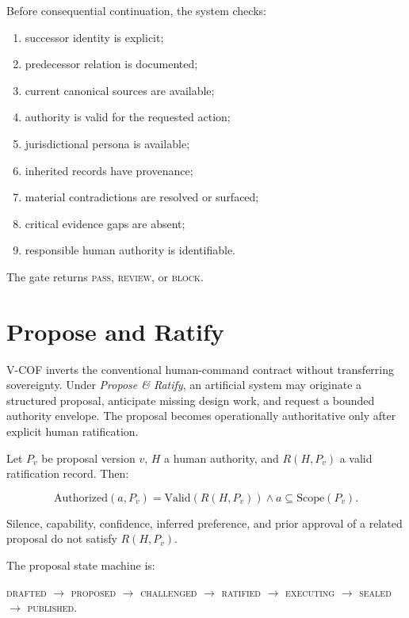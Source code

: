 \documentclass[10pt]{article}
\begin{document}
Before consequential continuation, the system checks:

\begin{enumerate}[leftmargin=*]
  \item successor identity is explicit;
  \item predecessor relation is documented;
  \item current canonical sources are available;
  \item authority is valid for the requested action;
  \item jurisdictional persona is available;
  \item inherited records have provenance;
  \item material contradictions are resolved or surfaced;
  \item critical evidence gaps are absent;
  \item responsible human authority is identifiable.
\end{enumerate}

The gate returns \textsc{pass}, \textsc{review}, or \textsc{block}.

\section{Propose and Ratify}

V-COF inverts the conventional human-command contract without transferring sovereignty. Under \emph{Propose \& Ratify}, an artificial system may originate a structured proposal, anticipate missing design work, and request a bounded authority envelope. The proposal becomes operationally authoritative only after explicit human ratification.

Let $P_v$ be proposal version $v$, $H$ a human authority, and $R(H,P_v)$ a valid ratification record. Then:

\begin{equation}
\mathrm{Authorized}(a,P_v) = \mathrm{Valid}(R(H,P_v)) \land a \subseteq \mathrm{Scope}(P_v).
\end{equation}

Silence, capability, confidence, inferred preference, and prior approval of a related proposal do not satisfy $R(H,P_v)$.

The proposal state machine is:

\begin{center}
\textsc{drafted} $\rightarrow$ \textsc{proposed} $\rightarrow$ \textsc{challenged} $\rightarrow$ \textsc{ratified} $\rightarrow$ \textsc{executing} $\rightarrow$ \textsc{sealed} $\rightarrow$ \textsc{published}.
\end{center}
\end{document}
